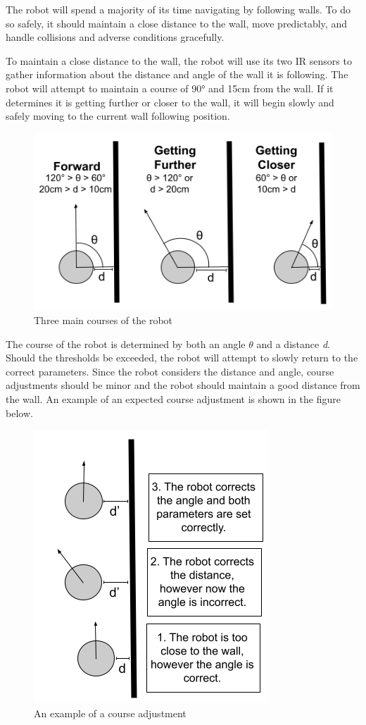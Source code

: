 \documentclass[12pt]{report}
\begin{document}
The robot will spend a majority of its time navigating by following walls. To do so safely, it should maintain a close distance to the wall, move predictably, and handle collisions and adverse conditions gracefully.

To maintain a close distance to the wall, the robot will use its two IR sensors to gather information about the distance and angle of the wall it is following. The robot will attempt to maintain a course of 90° and 15cm from the wall. If it determines it is getting further or closer to the wall, it will begin slowly and safely moving to the current wall following position.

\begin{figure}[H]
    \centering
    \includegraphics[scale=0.75]{images/Wall-Following Diagram.png}
    \caption{Three main courses of the robot}
    \label{Wall-following diagram}
\end{figure}

The course of the robot is determined by both an angle $\theta$ and a distance \textit{d}. Should the thresholds be exceeded, the robot will attempt to slowly return to the correct parameters. Since the robot considers the distance and angle, course adjustments should be minor and the robot should maintain a good distance from the wall. An example of an expected course adjustment is shown in the figure below.
\begin{figure}[H]
    \centering
    \includegraphics[scale=0.75]{images/Course adjustments.png}
    \caption{An example of a course adjustment}
    \label{Course Adjustments}
\end{figure}
\end{document}
